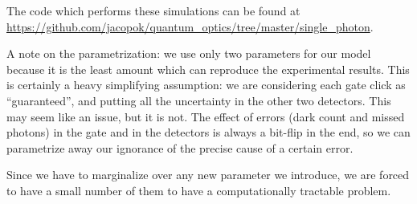 \documentclass[main.tex]{subfiles}
\begin{document}
The code which performs these simulations can be found at \url{https://github.com/jacopok/quantum_optics/tree/master/single_photon}. 

A note on the parametrization: we use only two parameters for our model because it is the least amount which can reproduce the experimental results.
This is certainly a heavy simplifying assumption: we are considering each gate click as ``guaranteed'', and putting all the uncertainty in the other two detectors.
This may seem like an issue, but it is not. The effect of errors (dark count and missed photons) in the gate and in the detectors is always a bit-flip in the end, so we can parametrize away our ignorance of the precise cause of a certain error. 

Since we have to marginalize over any new parameter we introduce, we are forced to have a small number of them to have a computationally tractable problem. 
\end{document}
